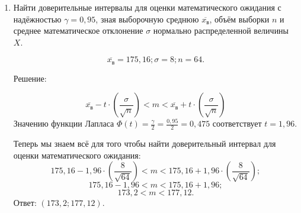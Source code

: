 \documentclass{article}
\begin{document}
\begin{enumerate}
\item %
Найти доверительные интервалы для оценки математического ожидания с надёжностью $\gamma=0,95$, зная выборочную среднюю $\overline{x_\textit{в}}$, объём выборки $n$ и среднее математическое отклонение $\sigma$ нормально распределенной величины $X$.

$$\overline{x_\textit{в}}=175,16; \sigma=8; n=64.$$
\begin{center}Решение:\end{center}
$$\overline{x_\textit{в}}-t\cdot\left(\frac{\sigma}{\sqrt{n}}\right)<m<\overline{x_\textit{в}}+t\cdot\left(\frac{\sigma}{\sqrt{n}}\right)$$
Значению функции Лапласа $\Phi(t)=\frac{\gamma}{2}=\frac{0,95}{2}=0,475$ соответствует $t=1,96$.

Теперь мы знаем всё для того чтобы найти доверительный интервал для оценки математического ожидания:
$$175,16-1,96\cdot\left(\frac{8}{\sqrt{64}}\right)<m<175,16+1,96\cdot\left(\frac{8}{\sqrt{64}}\right);$$
$$175,16-1,96<m<175,16+1,96;$$
$$173,2<m<177,12.$$
Ответ: $(173,2;177,12)$.

\end{enumerate}
\end{document}
